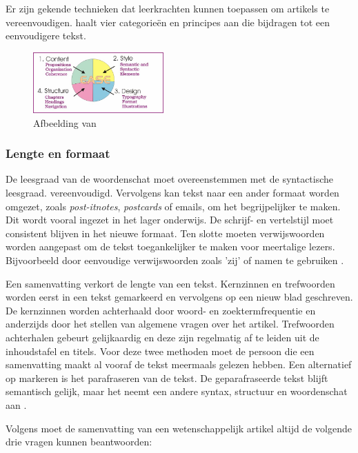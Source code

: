 Er zijn gekende technieken dat leerkrachten kunnen toepassen om artikels te vereenvoudigen. \textcite{Dubay2004} haalt vier categorieën en principes aan die bijdragen tot een eenvoudigere tekst.

\begin{figure}[H]
	\begin{center}
		\includegraphics[width=5cm]{img/text-simplification-reading-ease.png}
	\end{center}
	\caption{Afbeelding van \textcite{Dubay2004}}
\end{figure}


\subsubsection{Lengte en formaat}

De leesgraad van de woordenschat moet overeenstemmen met de syntactische leesgraad. vereenvoudigd. Vervolgens kan tekst naar een ander formaat worden omgezet, zoals \textit{post-itnotes}, \textit{postcards} of emails, om het begrijpelijker te maken. Dit wordt vooral ingezet in het lager onderwijs. De schrijf- en vertelstijl moet consistent blijven in het nieuwe formaat. Ten slotte moeten verwijswoorden worden aangepast om de tekst toegankelijker te maken voor meertalige lezers. Bijvoorbeeld door eenvoudige verwijswoorden zoals 'zij' of namen te gebruiken \autocite{Rijkhoff2022}. 

Een samenvatting verkort de lengte van een tekst. Kernzinnen en trefwoorden worden eerst in een tekst gemarkeerd en vervolgens op een nieuw blad geschreven. De kernzinnen worden achterhaald door woord- en zoektermfrequentie en anderzijds door het stellen van algemene vragen over het artikel. Trefwoorden achterhalen gebeurt gelijkaardig en deze zijn regelmatig af te leiden uit de inhoudstafel en titels. Voor deze twee methoden moet de persoon die een samenvatting maakt al vooraf de tekst meermaals gelezen hebben. Een alternatief op markeren is het parafraseren van de tekst. De geparafraseerde tekst blijft semantisch gelijk, maar het neemt een andere syntax, structuur en woordenschat aan \autocite{Rijkhoff2022}.

Volgens \textcite{Hollenkamp2020, McCombes2022} moet de samenvatting van een wetenschappelijk artikel altijd de volgende drie vragen kunnen beantwoorden: 

